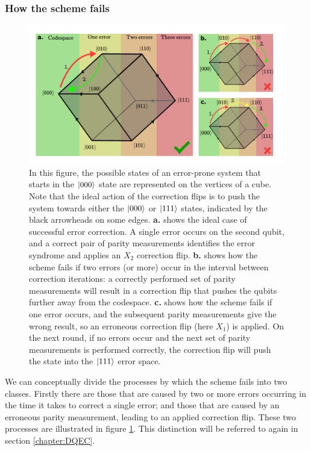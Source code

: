 \documentclass{report}
\begin{document}
\subsubsection{How the scheme fails}
\begin{figure}[ht]
    \centering
    \includegraphics[scale = 0.85]{Figures/cubediagram.pdf}
    \caption{In this figure, the possible states of an error-prone system that starts in the $\ket{000}$ state are represented on the vertices of a cube. Note that the ideal action of the correction flips is to push the system towards either the $\ket{000}$ or $\ket{111}$ states, indicated by the black arrowheads on some edges. \textbf{a.} shows the ideal case of successful error correction. A single error occurs on the second qubit, and a correct pair of parity measurements identifies the error syndrome and applies an $X_2$ correction flip. \textbf{b.} shows how the scheme fails if two errors (or more) occur in the interval between correction iterations: a correctly performed set of parity measurements will result in a correction flip that pushes the qubits further away from the codespace. \textbf{c.} shows how the scheme fails if one error occurs, and the subsequent parity measurements give the wrong result, so an erroneous correction flip (here $X_1$) is applied. On the next round, if no errors occur and the next set of parity measurements is performed correctly, the correction flip will push the state into the $\ket{111}$ error space.}
    \label{fig:cubediagram}
\end{figure}
We can conceptually divide the processes by which the scheme fails into two classes. Firstly there are those that are caused by two or more errors occurring in the time it takes to correct a single error; and those that are caused by an erroneous parity measurement, leading to an applied correction flip. These two processes are illustrated in figure \ref{fig:cubediagram}. This distinction will be referred to again in section \ref{chapter:DQEC}.
\end{document}
